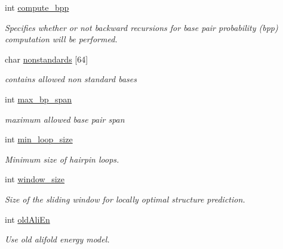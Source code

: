 \begin{DoxyCompactItemize}
int \mbox{\hyperlink{group__model__details_aa0c3e03d9064363e27adcc92b8d0380f}{compute\+\_\+bpp}}
\begin{DoxyCompactList}\small\item\em Specifies whether or not backward recursions for base pair probability (bpp) computation will be performed. \end{DoxyCompactList}\item 
\mbox{\label{group__model__details_a3fde4ac9eaf972f503c7a76726cefb59}} 
char \mbox{\hyperlink{group__model__details_a3fde4ac9eaf972f503c7a76726cefb59}{nonstandards}} \mbox{[}64\mbox{]}
\begin{DoxyCompactList}\small\item\em contains allowed non standard bases \end{DoxyCompactList}\item 
\mbox{\label{group__model__details_a659e5fcc6e8c9f1a68e7de6548eef3b0}} 
int \mbox{\hyperlink{group__model__details_a659e5fcc6e8c9f1a68e7de6548eef3b0}{max\+\_\+bp\+\_\+span}}
\begin{DoxyCompactList}\small\item\em maximum allowed base pair span \end{DoxyCompactList}\item 
int \mbox{\hyperlink{group__model__details_a9ed7ba42fcc46915c5c0c524f3d255f5}{min\+\_\+loop\+\_\+size}}
\begin{DoxyCompactList}\small\item\em Minimum size of hairpin loops. \end{DoxyCompactList}\item 
\mbox{\label{group__model__details_abea42f9229f8d8d6bcbedef316315bfc}} 
int \mbox{\hyperlink{group__model__details_abea42f9229f8d8d6bcbedef316315bfc}{window\+\_\+size}}
\begin{DoxyCompactList}\small\item\em Size of the sliding window for locally optimal structure prediction. \end{DoxyCompactList}\item 
\mbox{\label{group__model__details_ab53aec4503130877973c6111ae6f0f76}} 
int \mbox{\hyperlink{group__model__details_ab53aec4503130877973c6111ae6f0f76}{old\+Ali\+En}}
\begin{DoxyCompactList}\small\item\em Use old alifold energy model. \end{DoxyCompactList}\item 

\end{DoxyCompactItemize}
